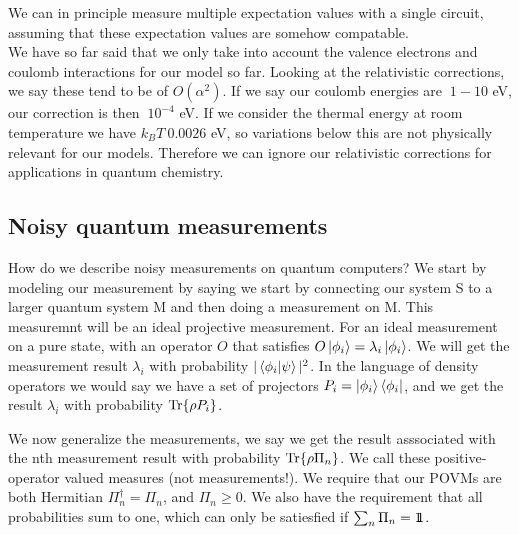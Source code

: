 We can in principle measure multiple expectation values with a single circuit, assuming that these expectation values are somehow compatable. \\
We have so far said that we only take into account the valence electrons and coulomb interactions for our model so far. Looking at the relativistic corrections, we say these tend to be of $O(\alpha^2)$.
If we say our coulomb energies are $~1-10$ eV, our correction is then $~10^{-4}$ eV. If we consider the thermal energy at room temperature we have $k_B T~0.0026$ eV, so variations below this are not physically relevant for our models.
Therefore we can ignore our relativistic corrections for applications in quantum chemistry.
\subsection{Noisy quantum measurements}
How do we describe noisy measurements on quantum computers? We start by modeling our measurement by saying we start by connecting our system S to a larger quantum system M and then doing a measurement on M. This measuremnt will be an ideal projective measurement.
For an ideal measurement on a pure state, with an operator $O$ that satisfies $O\ket{\phi_i} = \lambda_i \ket{\phi_i}$. We will get the measurement result $\lambda_i$ with probability $|\bra{\phi_i}\ket{\psi}|^2$.
In the language of density operators we would say we have a set of projectors $P_i = \ket{\phi_i}\bra{\phi_i}$, and we get the result $\lambda_i$ with probability $\Tr{\rho P_i}$.

We now generalize the measurements, we say we get the result asssociated with the nth measurement result with probability $\Tr{\rho\Pi_n}$. We call these positive-operator valued measures (not measurements!).
We require that our POVMs are both Hermitian $\Pi_n^\dagger = \Pi_n$, and $\Pi_n \geq 0$. We also have the requirement that all probabilities sum to one, which can only be satiesfied if $\sum_n \Pi_n = 1\!\!1$.

